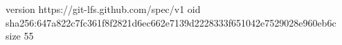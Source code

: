 version https://git-lfs.github.com/spec/v1
oid sha256:647a822c7fc361f8f2821d6ec662e7139d2228333f651042e7529028e960eb6c
size 55
